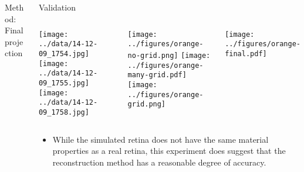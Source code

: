 \documentclass[final,hyperref={pdfpagelabels=false}]{beamer}
\begin{document}
\begin{frame}{}
\begin{columns}[T]
\begin{column}{.33\linewidth}
\begin{block}{Method: Final projection}
\begin{itemize}
\begin{itemize}
              \end{itemize}
            \end{itemize}

      \end{block}



    \end{column}

    \begin{column}{.33\linewidth}

      \begin{block}{Validation}
        \begin{columns}

          \texttt{[image: ../data/14-12-09\_1754.jpg]}
          \texttt{[image: ../data/14-12-09\_1755.jpg]}
          \texttt{[image: ../data/14-12-09\_1758.jpg]}

          \texttt{[image: ../figures/orange-no-grid.png]}
          \texttt{[image: ../figures/orange-many-grid.pdf]}
          \texttt{[image: ../figures/orange-grid.png]}


          \texttt{[image: ../figures/orange-final.pdf]}

        \end{columns}
        \begin{itemize}
        \item While the simulated retina does not have the same
          material properties as a real retina, this experiment does
          suggest that the reconstruction method has a reasonable
          degree of accuracy.
        \end{itemize}


\end{block}
\end{column}
\end{columns}
\end{frame}
\end{document}
